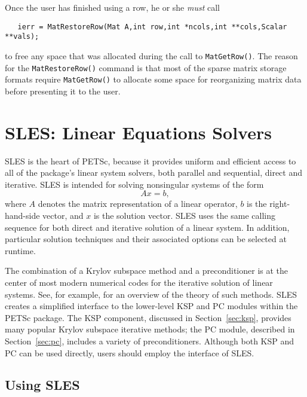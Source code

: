 Once the user has finished using a row, he or she {\em must} call 
\begin{verbatim}
   ierr = MatRestoreRow(Mat A,int row,int *ncols,int **cols,Scalar **vals);
\end{verbatim}
to free any space that was allocated during the call to {\tt MatGetRow()}.
The reason for the {\tt MatRestoreRow()} command is that most of the
sparse matrix storage formats require {\tt MatGetRow()} to allocate
some space for reorganizing matrix data before presenting it to the user.
 

\chapter{SLES: Linear Equations Solvers} 
\label{ch:sles}

SLES is the heart of PETSc, because it provides uniform and efficient access 
to all of the package's linear system solvers, both parallel and sequential,
direct and iterative.
SLES is intended for solving nonsingular systems of the form
\begin{equation}
   A x = b,
\label{eq:Ax=b}
\end{equation}
where $A$ denotes the matrix representation of a linear operator, $b$
is the right-hand-side vector, and $x$ is the solution vector.  SLES
uses the same calling sequence for both direct and iterative solution
of a linear system.  In addition, particular solution techniques and
their associated options can be selected at runtime.

The combination of a Krylov subspace method and a preconditioner is at
the center of most modern numerical codes for the iterative solution of
linear systems.  See, for example, \cite{fgn} for an overview of the theory
of such methods.  SLES creates a simplified interface to the
lower-level KSP and PC modules within the PETSc package.  The KSP component, 
discussed in
Section~\ref{sec:ksp}, provides many popular Krylov
 subspace iterative methods;
the PC module, described in Section~\ref{sec:pc}, includes a
variety of preconditioners.  Although both  KSP and PC can be used
directly, users should employ the interface of SLES.

\section{Using SLES} 
\label{sec:usingsles}

